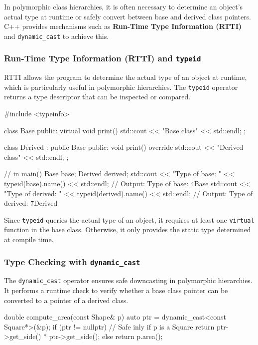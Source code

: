 In polymorphic class hierarchies, it is often necessary to determine an object's actual type at runtime or safely convert between base and derived class pointers. C++ provides mechanisms such as \textbf{Run-Time Type Information (RTTI)} and \texttt{dynamic\_cast} to achieve this.

\subsubsection{Run-Time Type Information (RTTI) and \texttt{typeid}}

RTTI allows the program to determine the actual type of an object at runtime, which is particularly useful in polymorphic hierarchies.
The \texttt{typeid} operator returns a type descriptor that can be inspected or compared.

\begin{codeblock}[language=C++]
#include <typeinfo>

class Base {
public:
    virtual void print() { std::cout << "Base class" << std::endl; }
};

class Derived : public Base {
public:
    void print() override { std::cout << "Derived class" << std::endl; }
};

// in main()
Base base;
Derived derived;
std::cout << "Type of base: " << typeid(base).name() << std::endl;
// Output: Type of base: 4Base
std::cout << "Type of derived: " << typeid(derived).name() << std::endl;
// Output: Type of derived: 7Derived
\end{codeblock}

Since \texttt{typeid} queries the actual type of an object, it requires at least one \texttt{virtual} function in the base class. Otherwise, it only provides the static type determined at compile time.

\subsubsection{Type Checking with \texttt{dynamic\_cast}}

The \texttt{dynamic\_cast} operator ensures safe downcasting in polymorphic hierarchies. It performs a runtime check to verify whether a base class pointer can be converted to a pointer of a derived class.

\begin{codeblock}[language=C++]
double compute_area(const Shape& p) {
    auto ptr = dynamic_cast<const Square*>(&p);
    if (ptr != nullptr) {
        // Safe inly if p is a Square
        return ptr->get_side() * ptr->get_side();
    } else {
        return p.area();
    }
}
\end{codeblock}

